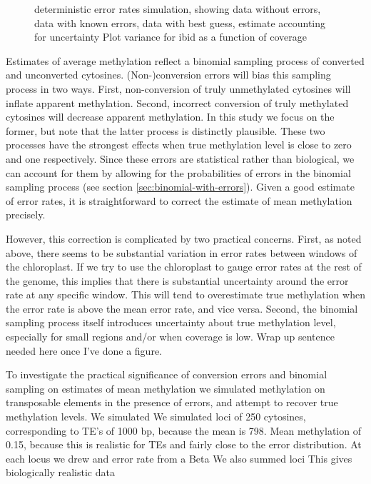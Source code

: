 \documentclass[12pt,longbibliography]{article}
\begin{document}
\begin{figure}
    \caption{
        deterministic error rates
        simulation, showing data without errors, data with known errors, data with best guess, estimate accounting for uncertainty
        Plot variance for ibid as a function of coverage
    }
\end{figure}

Estimates of average methylation reflect a binomial sampling process of converted and unconverted cytosines.
(Non-)conversion errors will bias this sampling process in two ways.
First, non-conversion of truly unmethylated cytosines will inflate apparent methylation.
Second, incorrect conversion of truly methylated cytosines will decrease apparent methylation.
In this study we focus on the former, but note that the latter process is distinctly plausible.
These two processes have the strongest effects when true methylation level is close to zero and one respectively.
Since these errors are statistical rather than biological, we can account for them by allowing for the probabilities of errors in the binomial sampling process (see section \ref{sec:binomial-with-errors}).
Given a good estimate of error rates, it is straightforward to correct the estimate of mean methylation precisely.

However, this correction is complicated by two practical concerns.
First, as noted above, there seems to be substantial variation in error rates between windows of the chloroplast.
If we try to use the chloroplast to gauge error rates at the rest of the genome, this implies that there is substantial uncertainty around the error rate at any specific window.
This will tend to overestimate true methylation when the error rate is above the mean error rate, and vice versa.
Second, the binomial sampling process itself introduces uncertainty about true methylation level, especially for small regions and/or when coverage is low.
Wrap up sentence needed here once I've done a figure.

To investigate the practical significance of conversion errors and binomial sampling on estimates of mean methylation we simulated methylation on transposable elements in the presence of errors, and attempt to recover true methylation levels.
We simulated 
We simulated loci of 250 cytosines, corresponding to TE's of 1000 bp, because the mean is 798.
Mean methylation of 0.15, because this is realistic for TEs and fairly close to the error distribution.
At each locus we drew and error rate from a Beta
We also summed loci
This gives biologically realistic data
\end{document}
